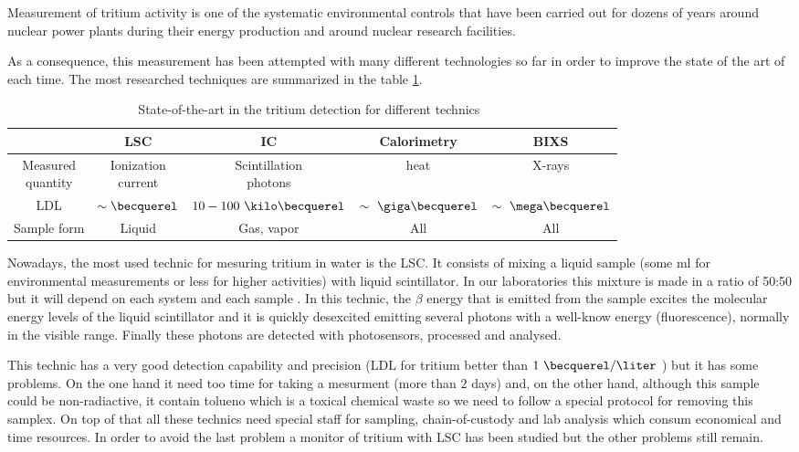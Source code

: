 Measurement of tritium activity is one of the systematic environmental controls that have been carried out for dozens of years around nuclear power plants during their energy production and around nuclear research facilities.

As a consequence, this measurement has been attempted with many different technologies so far in order to improve the state of the art of each time. The most researched techniques are summarized in the table \ref{DifferentThecnics}.

\begin{table}[htbp]
\begin{center}
\begin{tabular}{|c|c|c|c|c|}
\hline
 & LSC & IC & Calorimetry & BIXS\\
\hline \hline \hline
\parbox{5em}{\centering Measured\\ quantity} & \parbox{5em}{\centering Ionization\\ current} &  \parbox{5em}{\centering Scintillation\\ photons} & heat & X-rays\\ \hline
LDL & $\sim\becquerel$ & $10-100~\kilo\becquerel$ & $\sim~\giga\becquerel$ & $\sim~\mega\becquerel$ \\ \hline
Sample form & Liquid & Gas, vapor & All & All \\ \hline
\end{tabular}
\caption{State-of-the-art in the tritium detection for different technics~\cite{TesisTritio}}
\label{DifferentThecnics}
\end{center}
\end{table}

Nowadays, the most used technic for mesuring tritium in water is the LSC. It consists of mixing a liquid sample (some ml for environmental measurements or less for higher activities) with liquid scintillator. In our laboratories this mixture is made in a ratio of 50:50 \cite{LSCLARAM} but it will depend on each system and each sample \cite{LSCothers} \cite{HofstetterSeveral}. In this technic, the $\beta$ energy that is emitted from the sample excites the molecular energy levels of the liquid scintillator and it is quickly desexcited emitting several photons with a well-know energy (fluorescence), normally in the visible range. Finally these photons are detected with photosensors, processed and analysed.

This technic has a very good detection capability and precision (LDL for tritium better than $1~\becquerel/\liter$ \cite{0.6Bq_L}) but it has some problems. On the one hand it need too time for taking a mesurment (more than $2$ days) and, on the other hand, although this sample could be non-radiactive, it contain tolueno which is a toxical chemical waste so we need to follow a special protocol for removing this samplex. On top of that all these technics need special staff for sampling, chain-of-custody and lab analysis which consum economical and time resources. In order to avoid the last problem a monitor of tritium with LSC has been studied \cite{OnlineLSC} but the other problems still remain. 

